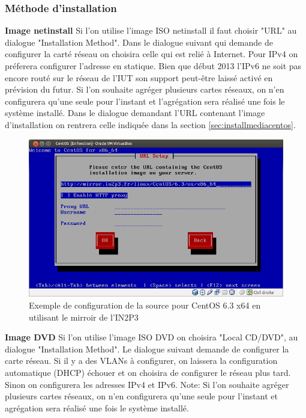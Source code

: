 \documentclass[a4paper,oneside]{report}
\begin{document}
\subsubsection{Méthode d'installation}
\textbf{Image netinstall}\newline
Si l'on utilise l'image ISO netinstall il faut choisir "URL" au dialogue "Installation Method".\newline
Dans le dialogue suivant qui demande de configurer la carté réseau on choisira celle qui est relié à Internet.
Pour IPv4 on préferera configurer l'adresse en statique.
Bien que début 2013 l'IPv6 ne soit pas encore routé sur le réseau de l'IUT son support peut-être laissé activé en prévision du futur.\newline
Si l'on souhaite agréger plusieurs cartes réseaux, on n'en configurera qu'une seule pour l'instant et l’agrégation sera réalisé une fois le système installé.\newline
Dans le dialogue demandant l'URL contenant l'image d'installation on rentrera celle indiquée dans la section \ref{sec:installmediacentos}.\newline
\begin{figure}[!h]
\centering
\includegraphics[resolution=110]{images/config_in2p3.png}
\caption{Exemple de configuration de la source pour CentOS 6.3 x64 en utilisant le mirroir de l'IN2P3}
\end{figure}

\textbf{Image DVD}\newline
Si l'on utilise l'image ISO DVD on choisira "Local CD/DVD", au dialogue "Installation Method".\newline
Le dialogue suivant demande de configurer la carte réseau.
Si il y a des VLANs à configurer, on laissera la configuration automatique (DHCP) échouer et on choisira de configurer le réseau plus tard.
Sinon on configurera les adresses IPv4 et IPv6.\newline
Note: Si l'on souhaite agréger plusieurs cartes réseaux, on n'en configurera qu'une seule pour l'instant et agrégation sera réalisé une fois le système installé.\newline
\end{document}
